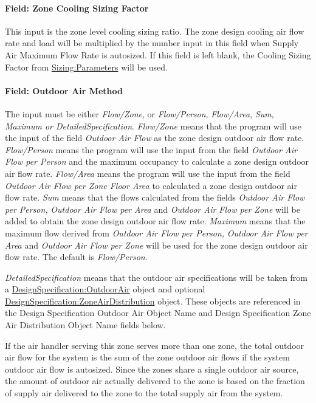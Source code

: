 \paragraph{Field: Zone Cooling Sizing Factor}\label{field-zone-cooling-sizing-factor-5}

This input is the zone level cooling sizing ratio. The zone design cooling air flow rate and load will be multiplied by the number input in this field when Supply Air Maximum Flow Rate is autosized. If this field is left blank, the Cooling Sizing Factor from \hyperref[sizingparameters]{Sizing:Parameters} will be used.

\paragraph{Field: Outdoor Air Method}\label{field-outdoor-air-method-7}

The input must be either \emph{Flow/Zone}, or \emph{Flow/Person}, \emph{Flow/Area}, \emph{Sum}, \emph{Maximum or DetailedSpecification}. \emph{Flow/Zone} means that the program will use the input of the field \emph{Outdoor Air Flow} as the zone design outdoor air flow rate. \emph{Flow/Person} means the program will use the input from the field \emph{Outdoor Air Flow per Person} and the maximum occupancy to calculate a zone design outdoor air flow rate. \emph{Flow/Area} means the program will use the input from the field \emph{Outdoor Air Flow per Zone Floor Area} to calculated a zone design outdoor air flow rate. \emph{Sum} means that the flows calculated from the fields \emph{Outdoor Air Flow per Person,} \emph{Outdoor Air Flow per Area} and \emph{Outdoor Air Flow per Zone} will be added to obtain the zone design outdoor air flow rate. \emph{Maximum} means that the maximum flow derived from \emph{Outdoor Air Flow per Person,} \emph{Outdoor Air Flow per Area} and \emph{Outdoor Air Flow per Zone} will be used for the zone design outdoor air flow rate. The default is \emph{Flow/Person}.

\emph{DetailedSpecification} means that the outdoor air specifications will be taken from a \hyperref[designspecificationoutdoorair]{DesignSpecification:OutdoorAir} object and optional \hyperref[designspecificationzoneairdistribution]{DesignSpecification:ZoneAirDistribution} object. These objects are referenced in the Design Specification Outdoor Air Object Name and Design Specification Zone Air Distribution Object Name fields below.

If the air handler serving this zone serves more than one zone, the total outdoor air flow for the system is the sum of the zone outdoor air flows if the system outdoor air flow is autosized. Since the zones share a single outdoor air source, the amount of outdoor air actually delivered to the zone is based on the fraction of supply air delivered to the zone to the total supply air from the system.

